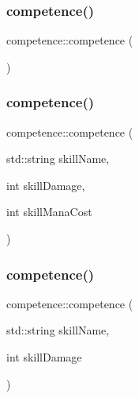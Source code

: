 \subsubsection{\texorpdfstring{competence()}{competence()}\hspace{0.1cm}{\footnotesize\ttfamily [1/3]}}
{\footnotesize\ttfamily competence\+::competence (\begin{DoxyParamCaption}{ }\end{DoxyParamCaption})}

\mbox{\label{classcompetence_ae214635d91c8b1c5a37352dccbcd2397}} 
\subsubsection{\texorpdfstring{competence()}{competence()}\hspace{0.1cm}{\footnotesize\ttfamily [2/3]}}
{\footnotesize\ttfamily competence\+::competence (\begin{DoxyParamCaption}\item[{std\+::string}]{skill\+Name,  }\item[{int}]{skill\+Damage,  }\item[{int}]{skill\+Mana\+Cost }\end{DoxyParamCaption})}

\mbox{\label{classcompetence_a269947808c5e8662ecabb11e96a4d9c0}} 
\subsubsection{\texorpdfstring{competence()}{competence()}\hspace{0.1cm}{\footnotesize\ttfamily [3/3]}}
{\footnotesize\ttfamily competence\+::competence (\begin{DoxyParamCaption}\item[{std\+::string}]{skill\+Name,  }\item[{int}]{skill\+Damage }\end{DoxyParamCaption})}

\mbox{\label{classcompetence_a158b19a476ae306eeaaa6672aab62e6c}} 
